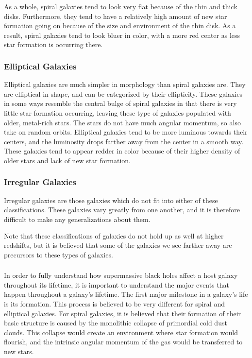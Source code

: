 \documentclass[12pt]{article}
\begin{document}
    As a whole, spiral galaxies tend to look very flat because of the thin and
    thick disks.  Furthermore, they tend to have a relatively high amount of new
    star formation going on because of the size and environment of the thin
    disk.  As a result, spiral galaxies tend to look bluer in color, with a more
    red center as less star formation is occurring there.

    \subsubsection{Elliptical Galaxies}
    Elliptical galaxies are much simpler in morphology than spiral galaxies are.
    They are elliptical in shape, and can be categorized by their ellipticity.
    These galaxies in some ways resemble the central bulge of spiral galaxies in
    that there is very little star formation occurring, leaving these type of
    galaxies populated with older, metal-rich stars.  The stars do not have much
    angular momentum, so also take on random orbits.  Elliptical galaxies tend
    to be more luminous towards their centers, and the luminosity drops farther
    away from the center in a smooth way.  These galaxies tend to appear redder
    in color because of their higher density of older stars and lack of new star
    formation.

    \subsubsection{Irregular Galaxies}
    Irregular galaxies are those galaxies which do not fit into either of these
    classifications.  These galaxies vary greatly from one another, and it is
    therefore difficult to make any generalizations about them.

    Note that these classifications of galaxies do not hold up as well at higher
    redshifts, but it is believed that some of the galaxies we see farther away
    are precursors to these types of galaxies.

    \subsubsection*{}
    \vspace{-5mm}
    In order to fully understand how supermassive black holes affect a host
    galaxy throughout its lifetime, it is important to understand the major
    events that happen throughout a galaxy's lifetime.  The first major
    milestone in a galaxy's life is its formation.  This process is believed to
    be very different for spiral and elliptical galaxies.  For spiral galaxies,
    it is believed that their formation of their basic structure is caused by
    the monolithic collapse of primordial cold dust clouds.  This collapse would
    create an environment where star formation would flourish, and the intrinsic
    angular momentum of the gas would be transferred to new stars.
\end{document}
